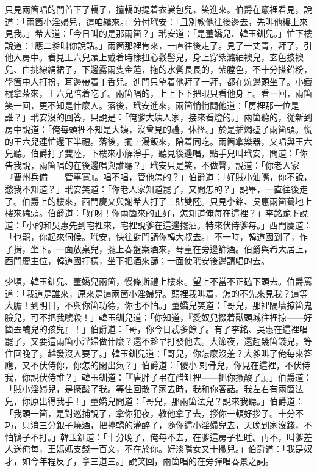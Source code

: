 只見兩箇唱的門首下了轎子，擡轎的提着衣裳包兒，笑進來。伯爵在窻裡看見，說道：「兩箇小淫婦兒，這咱纔來。」分付玳安：「且別教他往後邊去，先叫他樓上來見我。」希大道：「今日叫的是那兩箇？」玳安道：「是董嬌兒、韓玉釧兒。」忙下樓說道：「應二爹叫你說話。」兩箇那裡肯來，一直往後走了。見了一丈青，拜了，引他入房中。看見王六兒頭上戴着時樣扭心鬏髻兒，身上穿紫潞紬襖兒，玄色披襖兒、白挑線絹裙子，下邊露兩隻金蓮，拖的水鬢長長的，紫膛色，不十分搽鉛粉，學箇中人打扮，耳邊帶着丁香兒。進門只望着他拜了一拜，都在炕邊頭坐了。小鐵棍拿茶來，王六兒陪着吃了。兩箇唱的，上上下下把眼只看他身上。看一回，兩箇笑一回，更不知是什麼人。落後，玳安進來，兩箇悄悄問他道：「房裡那一位是誰？」玳安沒的回答，只說是：「俺爹大姨人家，接來看燈的。」兩箇聽的，從新到房中說道：「俺每頭裡不知是大姨，沒曾見的禮，休怪。」於是插燭磕了兩箇頭。慌的王六兒連忙還下半禮。落後，擺上湯飯來，陪着同吃。兩箇拿樂器，又唱與王六兒聽。伯爵打了雙陸，下樓來小解淨手，聽見後邊唱，點手兒叫玳安，{}問道：「你告我說，兩箇唱的在後邊唱與誰聽？」玳安只是笑，不做聲，說道：「你老人家『曹州兵備——管事寬』。唱不唱，管他怎的？」伯爵道：「好賊小油嘴，你不說，愁我不知道？」玳安笑道：「你老人家知道罷了，又問怎的？」說畢，一直往後走了。{}伯爵上的樓來，西門慶又與謝希大打了三貼雙陸。只見李銘、吳惠兩箇驀地上樓來磕頭。伯爵道：「好呀！你兩箇來的正好，怎知道俺每在這裡？」李銘跪下說道：「小的和吳惠先到宅裡來，宅裡說爹在這邊擺酒。特來伏侍爹每。」西門慶道：「也罷，你起來伺候。玳安，快往對門請你韓大叔去。」不一時，韓道國到了，作了揖，坐下。一面放桌兒，擺上春盤案酒來，琴童在旁邊篩酒。伯爵與希大居上，西門慶主位，韓道國打橫，坐下把酒來篩；一面使玳安後邊請唱的去。

少頃，韓玉釧兒、董嬌兒兩箇，慢條斯禮上樓來。望上不當不正磕下頭去。伯爵罵道：「我道是誰來，原來是這兩箇小淫婦兒。頭裡我叫着，怎的不先來見我？這等大膽！到明日，不與你箇功德，你也不怕。」董嬌兒笑道：「哥兒，那裡隔墻掠箇鬼臉兒，可不把我唬殺！」韓玉釧兒道：「你知道，『愛奴兒掇着獸頭城往裡掠——好箇丟醜兒的孩兒』！」伯爵道：「哥，你今日忒多餘了。有了李銘、吳惠在這裡唱罷了，又要這兩箇小淫婦做什麼？還不趁早打發他去。大節夜，還趕幾箇錢兒，等住回晚了，越發沒人要了。」韓玉釧兒道：「哥兒，你怎麼沒羞？大爹叫了俺每來答應，又不伏侍你，你怎的閑出氣？」伯爵道：「傻小𢱉剌骨兒，你見在這裡，不伏侍我，你說伏侍誰？」韓玉釧道：「『唐胖子弔在醋缸裡——把你撅酸了』。」伯爵道：「賊小淫婦兒，是撅酸了我。等住回散了家去時，我和你答話。我左右有兩箇法兒，你原出得我手！」董嬌兒問道：「哥兒，那兩箇法兒？說來我聽。」伯爵道：「我頭一箇，是對巡捕說了，拿你犯夜，教他拿了去，拶你一頓好拶子。十分不巧，只消三分銀子燒酒，把擡轎的灌醉了，隨你這小淫婦兒去，天晚到家沒錢，不怕鴇子不打。」韓玉釧道：「十分晚了，俺每不去，在爹這房子裡睡。再不，叫爹差人送俺每，王媽媽支錢一百文，不在於你。好淡嘴女又十撇兒。」{}伯爵道：「我是奴才，如今年程反了，拿三道三。」說笑回，兩箇唱的在旁彈唱春景之詞。

